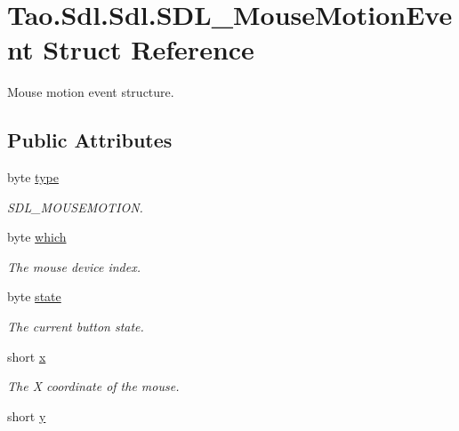 \hypertarget{struct_tao_1_1_sdl_1_1_sdl_1_1_s_d_l___mouse_motion_event}{
\section{Tao.Sdl.Sdl.SDL\_\-MouseMotionEvent Struct Reference}
\label{struct_tao_1_1_sdl_1_1_sdl_1_1_s_d_l___mouse_motion_event}
}


Mouse motion event structure.  


\subsection*{Public Attributes}
\begin{DoxyCompactItemize}
\item 
byte \hyperlink{struct_tao_1_1_sdl_1_1_sdl_1_1_s_d_l___mouse_motion_event_a8e2b9add20b3993257ea3017d2dde4f4}{type}
\begin{DoxyCompactList}\small\item\em SDL\_\-MOUSEMOTION. \item\end{DoxyCompactList}\item 
byte \hyperlink{struct_tao_1_1_sdl_1_1_sdl_1_1_s_d_l___mouse_motion_event_a6a09cb83bd7d41bf90c3655efdbe9033}{which}
\begin{DoxyCompactList}\small\item\em The mouse device index. \item\end{DoxyCompactList}\item 
byte \hyperlink{struct_tao_1_1_sdl_1_1_sdl_1_1_s_d_l___mouse_motion_event_a127c27891c775cd2318ba70f09d0c82c}{state}
\begin{DoxyCompactList}\small\item\em The current button state. \item\end{DoxyCompactList}\item 
short \hyperlink{struct_tao_1_1_sdl_1_1_sdl_1_1_s_d_l___mouse_motion_event_ab187d711c2cb67bd63e14fb9031f0bf4}{x}
\begin{DoxyCompactList}\small\item\em The X coordinate of the mouse. \item\end{DoxyCompactList}\item 
short \hyperlink{struct_tao_1_1_sdl_1_1_sdl_1_1_s_d_l___mouse_motion_event_a774d079f176855431e1c9f255048ce1d}{y}

\end{DoxyCompactItemize}
